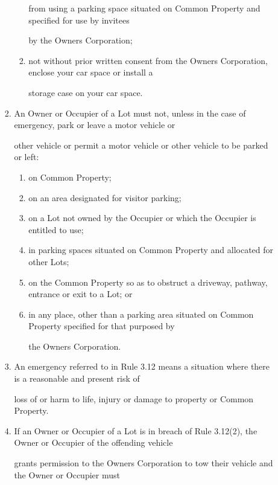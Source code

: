 \documentclass{article}
\begin{document}
\begin{enumerate}[label=\arabic*.]
\begin{enumerate}[label=\arabic{enumi}.\arabic*.]
\begin{enumerate}[label=(\arabic*)]
\begin{enumerate}[label=(\alph*)]
from using a parking space situated on Common Property and specified for use by invitees 

by the Owners Corporation; 

\item  not without prior written consent from the Owners Corporation, enclose your car space or install a 

storage case on your car space. 

\end{enumerate}
\item  An Owner or Occupier of a Lot must not, unless in the case of emergency, park or leave a motor vehicle or 

other vehicle or permit a motor vehicle or other vehicle to be parked or left: 

\begin{enumerate}[label=(\alph*)]
\item  on Common Property; 

\item  on an area designated for visitor parking; 

\item  on a Lot not owned by the Occupier or which the Occupier is entitled to use; 

\item  in parking spaces situated on Common Property and allocated for other Lots; 

\item  on the Common Property so as to obstruct a driveway, pathway, entrance or exit to a Lot; or 

\item  in any place, other than a parking area situated on Common Property specified for that purposed by 

the Owners Corporation. 

\end{enumerate}
\item  An emergency referred to in Rule 3.12 means a situation where there is a reasonable and present risk of 

loss of or harm to life, injury or damage to property or Common Property. 

\item  If an Owner or Occupier of a Lot is in breach of Rule 3.12(2), the Owner or Occupier of the offending vehicle 

grants permission to the Owners Corporation to tow their vehicle and the Owner or Occupier must 


\end{enumerate}
\end{enumerate}
\end{enumerate}
\end{document}

